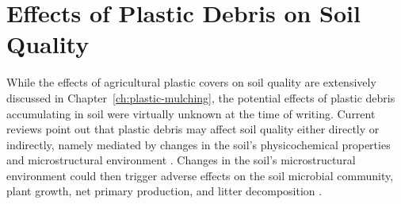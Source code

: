 \section{Effects of Plastic Debris on Soil Quality}
\label{sec:general-discussion:effects}

While the effects of agricultural plastic covers on soil quality are extensively discussed in Chapter~\ref{ch:plastic-mulching}, the potential effects of plastic debris accumulating in soil were virtually unknown at the time of writing.
Current reviews point out that plastic debris may affect soil quality either directly or indirectly, namely mediated by changes in the soil's physicochemical properties and microstructural environment \citep{ZhangSystematical2021,RilligMicroplastic2021,WangEffects2022}.
Changes in the soil's microstructural environment could then trigger adverse effects on the soil microbial community, plant growth, net primary production, and litter decomposition \citep{RilligMicroplastic2021,MbachuRise2021,QiBehavior2020}.

